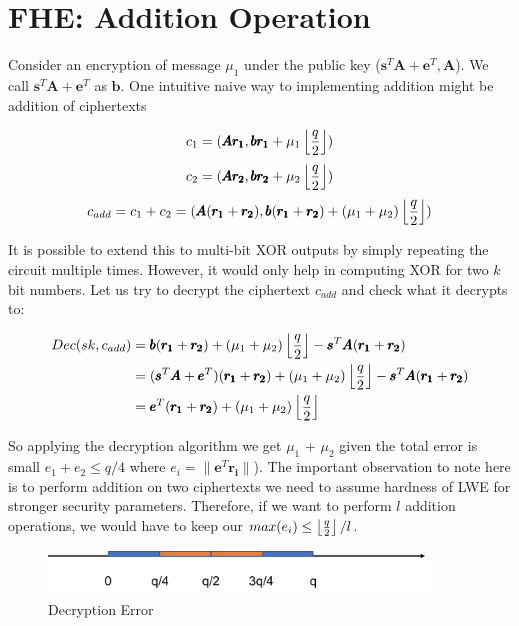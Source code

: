 \documentclass[usletter]{article}
\begin{document}
\section{FHE: Addition Operation}

Consider an encryption of message $\mu_1$ under the public key ($\pmb{s}^{T}\pmb{A} + \pmb{e}^{T}, \pmb{A}$). We call 
$\pmb{s}^{T}\pmb{A} + \pmb{e}^{T}$ as $\pmb{b}$. One intuitive naive way to implementing addition might be addition of 
ciphertexts

$$c_1 = ( \pmb{Ar_1}, \pmb{br_1} + \mu_1\left\lfloor \frac{q}{2} \right\rfloor )$$
$$c_2 = ( \pmb{Ar_2}, \pmb{br_2} + \mu_2\left\lfloor \frac{q}{2} \right\rfloor )$$
$$c_{add} = c_1 + c_2 = ( \pmb{A}(\pmb{r_1} + \pmb{r_2}), \pmb{b}(\pmb{r_1} +\pmb{r_2}) + (\mu_1 + \mu_2)\left\lfloor \frac{q}{2} \right\rfloor )$$

It is possible to extend this to multi-bit XOR outputs by simply repeating 
the circuit multiple times. However, it would only help in computing XOR for two $k$ bit numbers. 
Let us try to decrypt the ciphertext $c_{add}$ and check what it decrypts to:

\begin{align*}
Dec(sk,c_{add})
&= \pmb{b}(\pmb{r_1} +\pmb{r_2}) + (\mu_1 + \mu_2)\left\lfloor \frac{q}{2} \right\rfloor-\pmb{s}^T\pmb{A}(\pmb{r_1} + \pmb{r_2})\\
&=(\pmb{s}^{T}\pmb{A} + \pmb{e}^{T})(\pmb{r_1} +\pmb{r_2}) + (\mu_1 + \mu_2)\left\lfloor \frac{q}{2} \right\rfloor-\pmb{s}^T\pmb{A}(\pmb{r_1} + \pmb{r_2})\\
&=\pmb{e}^{T}(\pmb{r_1} +\pmb{r_2}) + (\mu_1 + \mu_2)\left\lfloor \frac{q}{2} \right\rfloor
\end{align*}


So applying the decryption algorithm we get $\mu_1$ + $\mu_2$ given the total error
is small $e_1 +e_2 \leq q/4$ where $e_i=\parallel\pmb{e}^{T}\pmb{r_i}\parallel$). The important observation to note here is to perform addition on 
two ciphertexts we need to assume hardness of LWE for stronger security parameters. 
Therefore, if we want to perform $l$ addition operations, we would have to keep our $max(e_i) \leq \left\lfloor \frac{q}{2} \right\rfloor/l$.   

\begin{figure}[!htbp]
\begin{center}
\includegraphics[width=0.9\textwidth]{error.pdf}
\end{center}
\caption{Decryption Error}
\label{error}
\end{figure}
\end{document}
